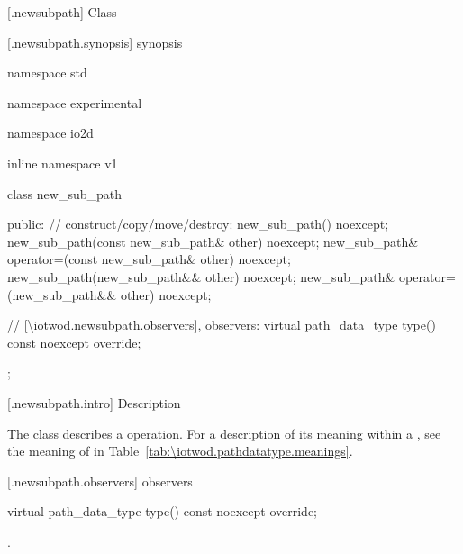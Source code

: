  [\iotwod.newsubpath] {Class }

 [\iotwod.newsubpath.synopsis] { synopsis}

\begin{codeblock}
namespace std { namespace experimental { namespace io2d { inline namespace v1 {
  class new_sub_path {
  public:
    // construct/copy/move/destroy:
    new_sub_path() noexcept;
    new_sub_path(const new_sub_path& other) noexcept;
    new_sub_path& operator=(const new_sub_path& other) noexcept;
    new_sub_path(new_sub_path&& other) noexcept;
    new_sub_path& operator=(new_sub_path&& other) noexcept;

    // \ref{\iotwod.newsubpath.observers}, observers:
    virtual path_data_type type() const noexcept override;
  };
} } } }
\end{codeblock}

 [\iotwod.newsubpath.intro] { Description}

\pnum
{}
The class  describes a  operation. For a description of its meaning within a , see the meaning of  in Table~\ref{tab:\iotwod.pathdatatype.meanings}.

 [\iotwod.newsubpath.observers]{ observers}

\begin{itemdecl}
    virtual path_data_type type() const noexcept override;
\end{itemdecl}
\begin{itemdescr}
	\pnum
	\returns
	.

\end{itemdescr}
